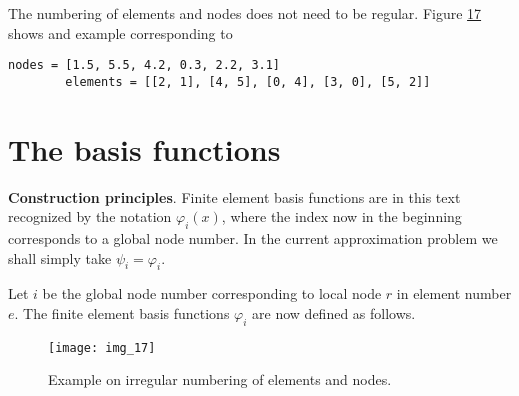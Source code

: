 \documentclass[../main.tex]{subfiles}
\begin{document}
	The numbering of elements and nodes does not need to be regular. Figure \hyperref[fig:img_17]{17}
	shows and example corresponding to
	\begin{lstlisting}[numbers=none]
		nodes = [1.5, 5.5, 4.2, 0.3, 2.2, 3.1]
		elements = [[2, 1], [4, 5], [0, 4], [3, 0], [5, 2]]	
	\end{lstlisting}
	\section[The basis functions]{The basis functions}
	\label{sec:sec_3_2}
	\noindent \textbf{Construction principles}. Finite element basis functions are in this text recognized by the notation $\varphi_{i}(x)$, where the index now in the beginning corresponds to a global node number. In the current approximation problem we shall simply take $\psi_{i}=\varphi_{i}$.
	
	Let $i$ be the global node number corresponding to local node $r$ in element number $e$. The finite element basis functions $\varphi_{i}$ are now defined as follows.
	\begin{figure}[H]
		\centering
		\texttt{[image: img\_17]}
		\caption{Example on irregular numbering of elements and nodes.}
		\label{fig:img_17}
	\end{figure}
	
\end{document}
